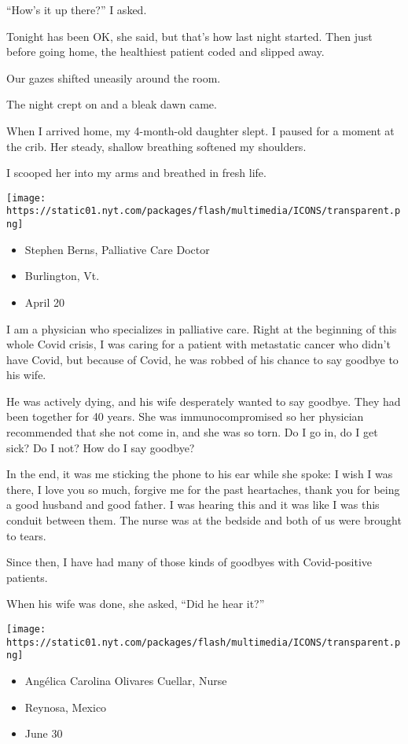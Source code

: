 ``How's it up there?'' I asked.

Tonight has been OK, she said, but that's how last night started. Then
just before going home, the healthiest patient coded and slipped away.

Our gazes shifted uneasily around the room.

The night crept on and a bleak dawn came.

When I arrived home, my 4-month-old daughter slept. I paused for a
moment at the crib. Her steady, shallow breathing softened my shoulders.

I scooped her into my arms and breathed in fresh life.

\texttt{[image: https://static01.nyt.com/packages/flash/multimedia/ICONS/transparent.png]}

\begin{itemize}
\tightlist
\item
  Stephen Berns, Palliative Care Doctor
\item
  Burlington, Vt.
\item
  April 20
\end{itemize}

I am a physician who specializes in palliative care. Right at the
beginning of this whole Covid crisis, I was caring for a patient with
metastatic cancer who didn't have Covid, but because of Covid, he was
robbed of his chance to say goodbye to his wife.

He was actively dying, and his wife desperately wanted to say goodbye.
They had been together for 40 years. She was immunocompromised so her
physician recommended that she not come in, and she was so torn. Do I go
in, do I get sick? Do I not? How do I say goodbye?

In the end, it was me sticking the phone to his ear while she spoke: I
wish I was there, I love you so much, forgive me for the past
heartaches, thank you for being a good husband and good father. I was
hearing this and it was like I was this conduit between them. The nurse
was at the bedside and both of us were brought to tears.

Since then, I have had many of those kinds of goodbyes with
Covid-positive patients.

When his wife was done, she asked, ``Did he hear it?''

\texttt{[image: https://static01.nyt.com/packages/flash/multimedia/ICONS/transparent.png]}

\begin{itemize}
\tightlist
\item
  Angélica Carolina Olivares Cuellar, Nurse
\item
  Reynosa, Mexico
\item
  June 30
\end{itemize}

